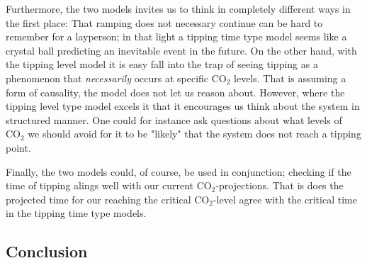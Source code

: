 Furthermore, the two models invites us to think in completely different ways in the first place: That ramping does not necessary continue can be hard to remember for a layperson; in that light a tipping time type model seems like a crystal ball predicting an inevitable event in the future. On the other hand, with the tipping level model it is easy fall into the trap of seeing tipping as a phenomenon that \textit{necessarily} occurs at specific $\mathrm{CO}_2$ levels. That is assuming a form of causality, the model does not let us reason about. However, where the tipping level type model excels it that it encourages us think about the system in structured manner. One could for instance ask questions about what levels of $\mathrm{CO}_2$ we should avoid for it to be "likely" that the system does not reach a tipping point. 

Finally, the two models could, of course, be used in conjunction; checking if the time of tipping alings well with our current $\mathrm{CO}_2$-projections. That is does the projected time for our reaching the critical $\mathrm{CO}_2$-level agree with the critical time in the tipping time type models.

\subsection{Conclusion}